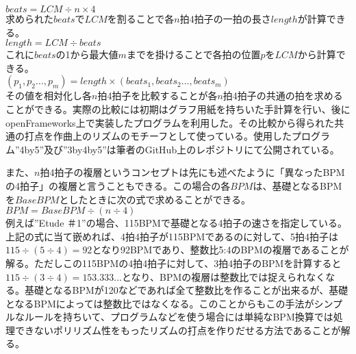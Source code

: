 \documentclass[uplatex,dvipdfmx]{ujarticle}
\begin{document}
\begin{math}
beats = LCM \div n \times 4
\end{math}\\

求められた$ beats $で$ LCM $を割ることで各$ n $拍4拍子の一拍の長さ$ length $が計算できる。\\

\begin{math}
length = LCM \div beats
\end{math}\\

これに$ beats $の1から最大値$ m $までを掛けることで各拍の位置$ p $を$ LCM $から計算できる。\\

\begin{math}
(p_1,p_2\dots,p_m) = length \times (beats_1,beats_2\dots,beats_m)
\end{math}\\

その値を相対化し各$ n $拍4拍子を比較することが各$ n $拍4拍子の共通の拍を求めることができる。実際の比較には初期はグラフ用紙を持ちいた手計算を行い、後にopenFrameworks上で実装したプログラムを利用した。その比較から得られた共通の打点を作曲上のリズムのモチーフとして使っている。使用したプログラム''4by5''\cite{yamato:02}及び''3by4by5''\cite{yamato:03}は筆者のGitHub上のレポジトリにて公開されている。

また、$ n $拍4拍子の複層というコンセプトは先にも述べたように「異なったBPMの4拍子」の複層と言うこともできる。この場合の各$ BPM $は、基礎となるBPMを$ BaseBPM $としたときに次の式で求めることができる。\\

\begin{math}
BPM = BaseBPM \div ( n \div 4 )
\end{math}\\

例えば''Etude ＃1''の場合、115BPMで基礎となる4拍子の速さを指定している。上記の式に当て嵌めれば、4拍4拍子が115BPMであるのに対して、5拍4拍子は$ 115 \div ( 5 \div 4 ) = 92 $となり92BPMであり、整数比5:4のBPMの複層であることが解る。ただしこの115BPMの4拍4拍子に対して、3拍4拍子のBPMを計算すると$ 115 \div ( 3 \div 4 ) = 153.333\dots $となり、BPMの複層は整数比では捉えられなくなる。基礎となるBPMが120などであれば全て整数比を作ることが出来るが、基礎となるBPMによっては整数比ではなくなる。このことからもこの手法がシンプルなルールを持ちいて、プログラムなどを使う場合には単純なBPM換算では処理できないポリリズム性をもったリズムの打点を作りだせる方法であることが解る。
\end{document}
